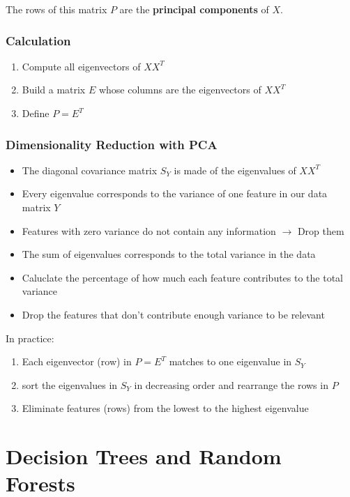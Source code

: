 \documentclass[11pt]{article}
\begin{document}
The rows of this matrix $P$ are the \textbf{principal components} of $X$.

\subsubsection{Calculation}

\begin{enumerate}
    \item Compute all eigenvectors of $XX^T$
    \item Build a matrix $E$ whose columns are the eigenvectors of $XX^T$
    \item Define $P = E^T$
\end{enumerate}

\subsubsection{Dimensionality Reduction with PCA}
\begin{itemize}
    \item The diagonal covariance matrix $S_Y$ is made of the eigenvalues of $XX^T$
    \item Every eigenvalue corresponds to the variance of one feature in our data matrix $Y$
    \item Features with zero variance do not contain any information $\rightarrow$ Drop them
    \item The sum of eigenvalues corresponds to the total variance in the data
    \item Caluclate the percentage of how much each feature contributes to the total variance
    \item Drop the features that don't contribute enough variance to be relevant
\end{itemize}

In practice:

\begin{enumerate}
    \item Each eigenvector (row) in $P = E^T$ matches to one eigenvalue in $S_Y$
    \item sort the eigenvalues in $S_Y$ in decreasing order and rearrange the rows in $P$
    \item Eliminate features (rows) from the lowest to the highest eigenvalue
\end{enumerate}

\section{Decision Trees and Random Forests}
\end{document}
